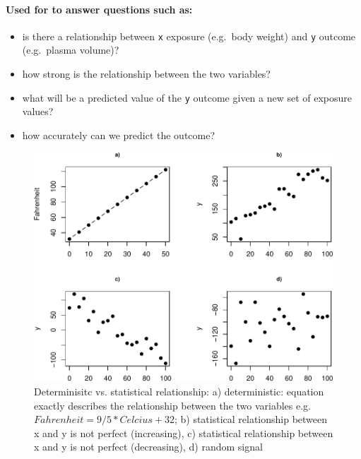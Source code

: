 \documentclass[]{article}
\providecommand{\tightlist}{%
  \setlength{\itemsep}{0pt}\setlength{\parskip}{0pt}}
\let\oldparagraph\paragraph
\renewcommand{\paragraph}[1]{\oldparagraph{#1}\mbox{}}
\begin{document}
\hypertarget{used-for-to-answer-questions-such-as}{%
\paragraph{Used for to answer questions such
as:}\label{used-for-to-answer-questions-such-as}}

\begin{itemize}
\tightlist
\item
  is there a relationship between \texttt{x} exposure (e.g.~body weight)
  and \texttt{y} outcome (e.g.~plasma volume)?
\item
  how strong is the relationship between the two variables?
\item
  what will be a predicted value of the \texttt{y} outcome given a new
  set of exposure values?
\item
  how accurately can we predict the outcome?
\end{itemize}

\newpage

\begin{figure}[H]

{\centering \includegraphics{session-regression-I-files/figures/fig-intro-det-vs-stat-1} 

}

\caption{Determinisitc vs. statistical relationship: a) deterministic: equation exactly describes the relationship between the two variables e.g. $Fahrenheit=9/5*Celcius+32$; b) statistical relationship between x and y is not perfect (increasing), c)  statistical relationship between x and y is not perfect (decreasing), d) random signal}\label{fig:fig-intro-det-vs-stat}
\end{figure}
\end{document}
